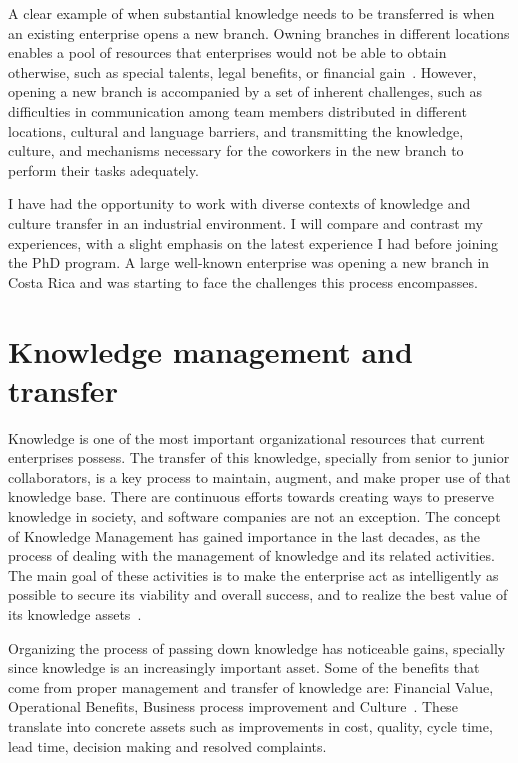 \documentclass[12pt, letterpaper]{article}
\begin{document}
A clear example of when substantial knowledge needs to be transferred is when an existing 
enterprise opens a new branch.
Owning branches in different locations enables a pool of resources that enterprises would not be able
to obtain otherwise, such as special talents, legal benefits, or financial gain~\cite{ceruttia07}. However, 
opening a new branch is accompanied by a set of inherent challenges, such as 
difficulties in communication among team members distributed in different locations, 
cultural and language barriers, and transmitting the knowledge, culture, and mechanisms necessary for the 
coworkers in the new branch to perform their tasks adequately.

I have had the opportunity to work with diverse contexts of knowledge and culture transfer in 
an industrial environment. I will compare and contrast my experiences, with a slight emphasis on the 
latest experience I had before joining the PhD program. A large well-known enterprise was 
opening a new branch in Costa Rica and was starting to face the challenges this process encompasses.  

\section{Knowledge management and transfer}
Knowledge is one of the most important organizational resources that current enterprises possess.
The transfer of this knowledge, specially from senior to junior collaborators, 
is a key process to maintain, augment, and
make proper use of that knowledge base. 
There are continuous efforts towards creating ways to preserve knowledge in society, and software 
companies are not an exception. The concept of Knowledge Management
has gained importance in the last decades, as the process of dealing with the management 
of knowledge and its related activities. 
The main goal of these activities is to make the enterprise act as intelligently as possible to secure its viability and overall success, and
to realize the best value of its knowledge assets~\cite{wiig97}.

Organizing the process of passing down knowledge has noticeable gains, 
specially since knowledge is an increasingly important asset. Some of the benefits that come from proper management and transfer of knowledge are: Financial
Value, Operational Benefits, Business process improvement and Culture~\cite{ibrahim09}. These translate into concrete assets such as
improvements in cost, quality, cycle time, lead time, decision making and resolved complaints.
\end{document}
